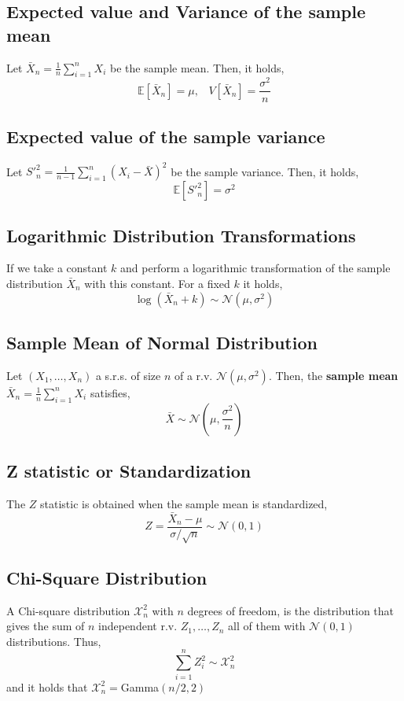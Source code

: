 \subsection{Expected value and Variance of the sample mean}
Let $\bar{X}_n = \frac{1}{n}\sum_{i=1}^n X_i$ be the sample mean. Then, it
holds,
\[ \mathbb{E}[\bar{X}_n] = \mu,\;\;\; V[\bar{X}_n] = \frac{\sigma^2}{n} \]

\subsection{Expected value of the sample variance}
Let $S'^2_n = \frac{1}{n-1}\sum_{i=1}^{n} (X_i-\bar{X})^2 $ be the sample
variance. Then, it holds,
\[ \mathbb{E}[S'^2_n] = \sigma^2 \]

\subsection{Logarithmic Distribution Transformations}
If we take a constant $k$ and perform a logarithmic transformation of the sample
distribution $\bar{X}_n$ with this constant. For a fixed $k$ it holds,
\[ \log(\bar{X}_n + k) \sim \mathcal{N}(\mu, \sigma^2) \]

\subsection{Sample Mean of Normal Distribution}
Let $(X_1,\dots,X_n)$ a s.r.s. of size $n$ of a r.v.
$\mathcal{N}(\mu,\sigma^2)$. Then, the \textbf{sample mean} $\bar{X}_n =
\frac{1}{n}\sum_{i=1}^n X_i$ satisfies,
\[ \bar{X} \sim \mathcal{N}(\mu,\frac{\sigma^2}{n}) \]

\subsection{Z statistic or Standardization}
The $Z$ statistic is obtained when the sample mean is standardized,
\[ Z = \frac{\bar{X}_n - \mu}{\sigma / \sqrt{n}} \sim \mathcal{N}(0,1) \]

\subsection{Chi-Square Distribution}
A Chi-square distribution $\mathcal{X}_n^2$ with $n$ degrees of freedom, is the
distribution that gives the sum of $n$ independent r.v. $Z_1,\dots,Z_n$ all of
them with $\mathcal{N}(0,1)$ distributions. Thus,
\[ \sum_{i=1}^n Z_i^2 \sim \mathcal{X}_n^2 \] and it holds that $\mathcal{X}^2_n
= $Gamma$(n/2,2)$

